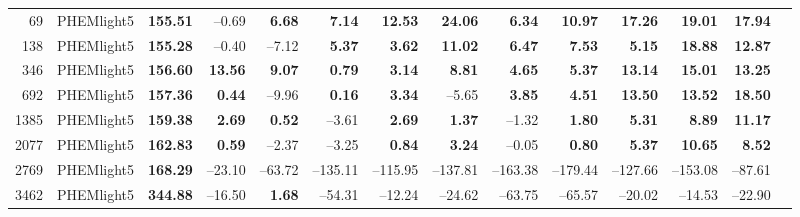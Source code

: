 \begin{table}[htb]
{\begin{tabular}{r l *{12}{r}}
      \midrule
      69   & PHEMlight5 & \textbf{155.51}      & –0.69  & \textbf{6.68}  & \textbf{7.14}  & \textbf{12.53} & \textbf{24.06} & \textbf{6.34}  & \textbf{10.97} & \textbf{17.26} & \textbf{19.01} & \textbf{17.94} \\
      138  & PHEMlight5 & \textbf{155.28}      & –0.40  & –7.12  & \textbf{5.37}  & \textbf{3.62}  & \textbf{11.02} & \textbf{6.47}  & \textbf{7.53}  & \textbf{5.15}  & \textbf{18.88} & \textbf{12.87} \\
      346  & PHEMlight5 & \textbf{156.60}      & \textbf{13.56} & \textbf{9.07}  & \textbf{0.79}  & \textbf{3.14}  & \textbf{8.81}  & \textbf{4.65}  & \textbf{5.37}  & \textbf{13.14} & \textbf{15.01} & \textbf{13.25} \\
      692  & PHEMlight5 & \textbf{157.36}      & \textbf{0.44}  & –9.96  & \textbf{0.16}  & \textbf{3.34}  & –5.65  & \textbf{3.85}  & \textbf{4.51}  & \textbf{13.50} & \textbf{13.52} & \textbf{18.50} \\
      1385 & PHEMlight5 & \textbf{159.38}      & \textbf{2.69}  & \textbf{0.52}  & –3.61 & \textbf{2.69}  & \textbf{1.37}  & –1.32  & \textbf{1.80}  & \textbf{5.31}  & \textbf{8.89}  & \textbf{11.17} \\
      2077 & PHEMlight5 & \textbf{162.83}      & \textbf{0.59}  & –2.37  & –3.25 & \textbf{0.84}  & \textbf{3.24}  & –0.05  & \textbf{0.80}  & \textbf{5.37}  & \textbf{10.65} & \textbf{8.52}  \\
      2769 & PHEMlight5 & \textbf{168.29}      & –23.10 & –63.72 & –135.11 & –115.95 & –137.81 & –163.38 & –179.44 & –127.66 & –153.08 & –87.61 \\
      3462 & PHEMlight5 & \textbf{344.88}      & –16.50 & \textbf{1.68}  & –54.31 & –12.24 & –24.62 & –63.75 & –65.57 & –20.02 & –14.53 & –22.90 \\
      \bottomrule
    \end{tabular}%
  }
\end{table}
